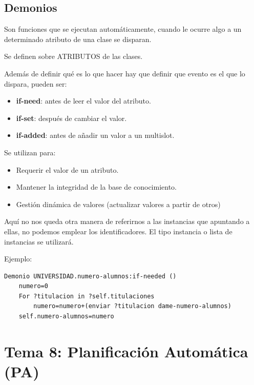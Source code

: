 \documentclass[12pt, twoside, openright]{report} %
\begin{document}
\section{Demonios}
Son funciones que se ejecutan automáticamente, cuando le ocurre algo a un determinado atributo de una clase se disparan.

Se definen sobre ATRIBUTOS de las clases.

Además de definir qué es lo que hacer hay que definir que evento es el que lo dispara, pueden ser:
\begin{itemize}
	\item \textbf{if-need}: antes de leer el valor del atributo.
	\item \textbf{if-set}: después de cambiar el valor.
	\item \textbf{if-added}: antes de añadir un valor a un multislot.
\end{itemize}

Se utilizan para:
\begin{itemize}
	\item Requerir el valor de un atributo.
	\item Mantener la integridad de la base de conocimiento.
	\item Gestión dinámica de valores (actualizar valores a partir de otros)
\end{itemize}

Aquí no nos queda otra manera de referirnos a las instancias que apuntando a ellas, no podemos emplear los identificadores. El tipo instancia o lista de instancias se utilizará.
\pagebreak

Ejemplo:
\begin{lstlisting}
Demonio UNIVERSIDAD.numero-alumnos:if-needed ()
	numero=0
	For ?titulacion in ?self.titulaciones
		numero=numero+(enviar ?titulacion dame-numero-alumnos)
	self.numero-alumnos=numero
\end{lstlisting}

\chapter{Tema 8: Planificación Automática (PA)}
\end{document}

